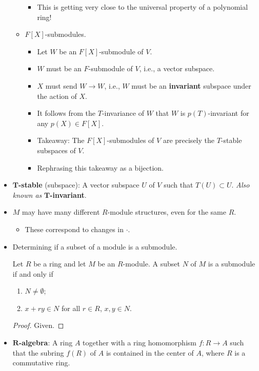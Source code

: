 \documentclass[../notes.tex]{subfiles}
\begin{document}
\begin{itemize}
\begin{itemize}
\begin{itemize}
            \item This is getting very close to the universal property of a polynomial ring!
        \end{itemize}
        \item $F[X]$-submodules.
        \begin{itemize}
            \item Let $W$ be an $F[X]$-submodule of $V$.
            \item $W$ must be an $F$-submodule of $V$, i.e., a vector subspace.
            \item $X$ must send $W\to W$, i.e., $W$ must be an \textbf{invariant} subspace under the action of $X$.
            \item It follows from the $T$-invariance of $W$ that $W$ is $p(T)$-invariant for any $p(X)\in F[X]$.
            \item Takeaway: The $F[X]$-submodules of $V$ are precisely the $T$-stable subspaces of $V$.
            \item Rephrasing this takeaway as a bijection.
        \end{itemize}
    \end{itemize}
    \item \textbf{$\bm{T}$-stable} (subspace): A vector subspace $U$ of $V$ such that $T(U)\subset U$. \emph{Also known as} \textbf{$\bm{T}$-invariant}.
    \item {}$M$ may have many different $R$-module structures, even for the same $R$.
    \begin{itemize}
        \item These correspond to changes in $\cdot$.
    \end{itemize}
    \item Determining if a subset of a module is a submodule.
    \begin{proposition}\label{prp:10.1}
        Let $R$ be a ring and let $M$ be an $R$-module. A subset $N$ of $M$ is a submodule if and only if
        \begin{enumerate}
            \item $N\neq\emptyset$;
            \item $x+ry\in N$ for all $r\in R$, $x,y\in N$.
        \end{enumerate}
        \begin{proof}
            Given.
        \end{proof}
    \end{proposition}
    \item \textbf{$\bm{R}$-algebra}: A ring $A$ together with a ring homomorphism $f:R\to A$ such that the subring $f(R)$ of $A$ is contained in the center of $A$, where $R$ is a commutative ring.

\end{itemize}
\end{document}
